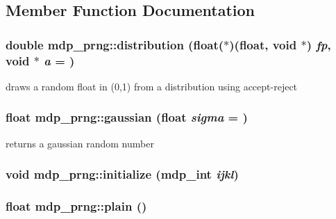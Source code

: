 \subsection{Member Function Documentation}
\hypertarget{classmdp__prng_a2ba8807aa153b9b222d6d724da06dfdd}{
\subsubsection[{distribution}]{\setlength{\rightskip}{0pt plus 5cm}double mdp\_\-prng::distribution (float($\ast$)(float, void $\ast$) {\em fp}, \/  void $\ast$ {\em a} = {})}}
\label{classmdp__prng_a2ba8807aa153b9b222d6d724da06dfdd}


draws a random float in (0,1) from a distribution using accept-\/reject \hypertarget{classmdp__prng_adf372628df14ef01302472264a7f26d8}{
\subsubsection[{gaussian}]{\setlength{\rightskip}{0pt plus 5cm}float mdp\_\-prng::gaussian (float {\em sigma} = {})}}
\label{classmdp__prng_adf372628df14ef01302472264a7f26d8}


returns a gaussian random number \hypertarget{classmdp__prng_a2a41d455e32ec21fce0c76f71bda801a}{
\subsubsection[{initialize}]{\setlength{\rightskip}{0pt plus 5cm}void mdp\_\-prng::initialize ({\bf mdp\_\-int} {\em ijkl})}}
\label{classmdp__prng_a2a41d455e32ec21fce0c76f71bda801a}
\hypertarget{classmdp__prng_a261360660403dcd1a76305a8644b6a2d}{
\subsubsection[{plain}]{\setlength{\rightskip}{0pt plus 5cm}float mdp\_\-prng::plain ()}}
\label{classmdp__prng_a261360660403dcd1a76305a8644b6a2d}


